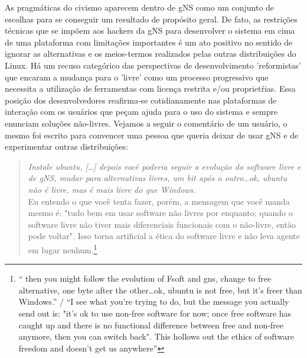 As pragmáticas do civismo aparecem dentro de gNS como um conjunto de escolhas para se conseguir um resultado de propósito geral. De fato, as restrições técnicas que se impõem aos hackers da gNS para desenvolver o sistema em cima de uma plataforma com limitações importantes é um ato positivo no sentido de ignorar as alternativas e os meios-termos realizados pelas outras distribuições do Linux. Há um recuso categórico das perspectivas de desenvolvimento 'reformistas' que encaram a mudança para o 'livre' como um processo progressivo que necessita a utilização de ferramentas com licença restrita e/ou propriet\'rias. Essa posição dos desenvolvedores reafirma-se cotidianamente nas plataformas de interação com os usuários que peçam ajuda para o uso do sistema e sempre enunciam soluções não-livres. Vejamos a seguir o comentário de um usuário, o mesmo foi escrito para convencer uma pessoa que queria deixar de usar gNS e de experimentar outras distribuições:

\begin{quote}
\textit{Instale ubuntu, [\ldots] depois você poderia seguir a evolução do software 
livre e de gNS, mudar para alternativas livres, um bit após o outro\ldots ok, 
ubuntu não é livre, mas é mais livre do que Windows.}\\
Eu entendo o que você tenta fazer, porém, a mensagem que você manda mesmo é: "tudo bem em usar software não livres por enquanto; quando o software livre não tiver mais diferenciais funcionais com o não-livre, então pode voltar". Isso torna artificial a ética do software livre e não leva agente em lugar nenhum.\footnote{“ then you might follow the evolution of Fsoft and gns, change to free alternative, one byte after the other\ldots ok, ubuntu is not free, but it's freer than Windows.” / “I see what you're trying to do, but the message you actually send out is: "it's ok to use non-free software for now; once free software has caught up and there is no functional difference between free and non-free anymore, then you can switch back". This hollows out the ethics of software freedom and doesn't get us anywhere”}
\end{quote}

